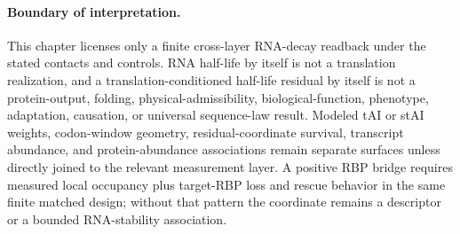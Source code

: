 \paragraph{Boundary of interpretation.}
This chapter licenses only a finite cross-layer RNA-decay readback under the stated contacts and controls.  RNA half-life by itself is not a translation realization, and a translation-conditioned half-life residual by itself is not a protein-output, folding, physical-admissibility, biological-function, phenotype, adaptation, causation, or universal sequence-law result.  Modeled tAI or stAI weights, codon-window geometry, residual-coordinate survival, transcript abundance, and protein-abundance associations remain separate surfaces unless directly joined to the relevant measurement layer.  A positive RBP bridge requires measured local occupancy plus target-RBP loss and rescue behavior in the same finite matched design; without that pattern the coordinate remains a descriptor or a bounded RNA-stability association.
